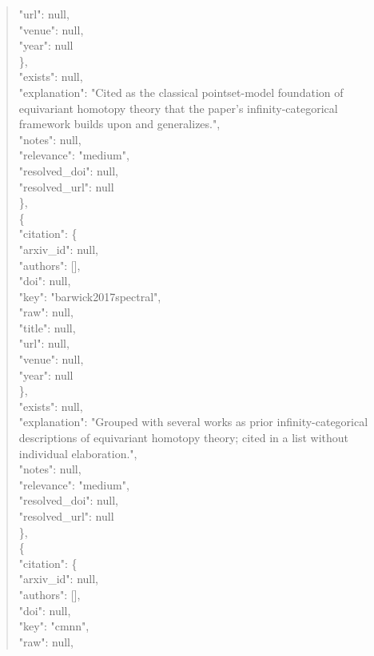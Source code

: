 \documentclass[11pt]{article}
\begin{document}
\begin{quote}
        "url": null,\\
        "venue": null,\\
        "year": null\\
      \},\\
      "exists": null,\\
      "explanation": "Cited as the classical pointset-model foundation of equivariant homotopy theory that the paper's infinity-categorical framework builds upon and generalizes.",\\
      "notes": null,\\
      "relevance": "medium",\\
      "resolved\_doi": null,\\
      "resolved\_url": null\\
    \},\\
    \{\\
      "citation": \{\\
        "arxiv\_id": null,\\
        "authors": [],\\
        "doi": null,\\
        "key": "barwick2017spectral",\\
        "raw": null,\\
        "title": null,\\
        "url": null,\\
        "venue": null,\\
        "year": null\\
      \},\\
      "exists": null,\\
      "explanation": "Grouped with several works as prior infinity-categorical descriptions of equivariant homotopy theory; cited in a list without individual elaboration.",\\
      "notes": null,\\
      "relevance": "medium",\\
      "resolved\_doi": null,\\
      "resolved\_url": null\\
    \},\\
    \{\\
      "citation": \{\\
        "arxiv\_id": null,\\
        "authors": [],\\
        "doi": null,\\
        "key": "cmnn",\\
        "raw": null,\\

\end{quote}
\end{document}
